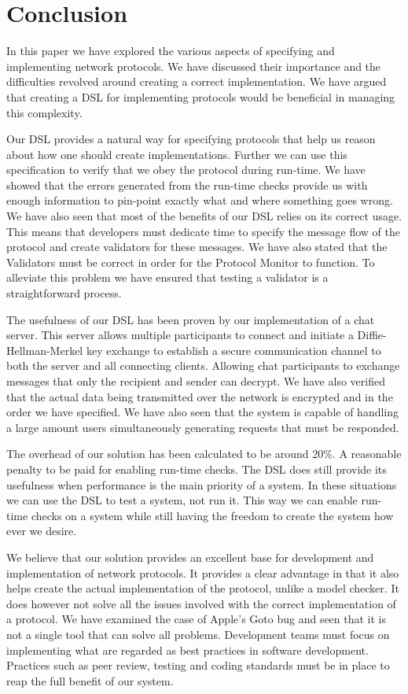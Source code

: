 \section{Conclusion}
In this paper we have explored the various aspects of specifying and implementing network protocols. We have discussed their importance and the difficulties revolved around creating a correct implementation. We have argued that creating a DSL for implementing protocols would be beneficial in managing this complexity.

Our DSL provides a natural way for specifying protocols that help us reason about how one should create implementations. Further we can use this specification to verify that we obey the protocol during run-time. We have showed that the errors generated from the run-time checks provide us with enough information to pin-point exactly what and where something goes wrong. We have also seen that most of the benefits of our DSL relies on its correct usage. This means that developers must dedicate time to specify the message flow of the protocol and create validators for these messages. We have also stated that the Validators must be correct in order for the Protocol Monitor to function. To alleviate this problem we have ensured that testing a validator is a straightforward process.

The usefulness of our DSL has been proven by our implementation of a chat server. This server allows multiple participants to connect and initiate a Diffie-Hellman-Merkel key exchange to establish a secure communication channel to both the server and all connecting clients. Allowing chat participants to exchange messages that only the recipient and sender can decrypt. We have also verified that the actual data being transmitted over the network is encrypted and in the order we have specified. We have also seen that the system is capable of handling a large amount users simultaneously generating requests that must be responded.

The overhead of our solution has been calculated to be around 20\%. A reasonable penalty to be paid for enabling run-time checks. The DSL does still provide its usefulness when performance is the main priority of a system. In these situations we can use the DSL to test a system, not run it. This way we can enable run-time checks on a system while still having the freedom to create the system how ever we desire.

We believe that our solution provides an excellent base for development and implementation of network protocols. It provides a clear advantage in that it also helps create the actual implementation of the protocol, unlike a model checker. It does however not solve all the issues involved with the correct implementation of a protocol. We have examined the case of Apple's Goto bug and seen that it is not a single tool that can solve all problems. Development teams must focus on implementing what are regarded as best practices in software development. Practices such as peer review, testing and coding standards must be in place to reap the full benefit of our system.


